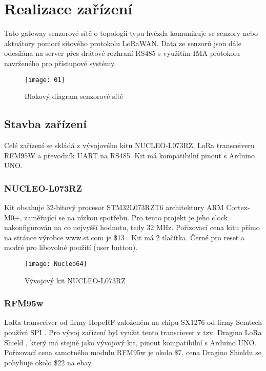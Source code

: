 \chapter{Realizace zařízení}

Tato gateway senzorové sítě o topologii typu hvězda komunikuje se senzory nebo aktuátory pomocí síťového protokolu LoRaWAN.
Data ze senzorů jsou dále odesílána na server přes drátové rozhraní RS485 s využitím IMA protokolu navrženého pro přístupové systémy.



\begin{figure}[!h]
    \centering
    \texttt{[image: 01]}
    \caption{Blokový diagram senzorové sítě}
    \label{fig:01}
\end{figure}

\newpage


\section{Stavba zařízení}
Celé zařízení se skládá z vývojového kitu NUCLEO-L073RZ, LoRa transceiveru RFM95W a převodník UART na RS485. Kit má kompatibilní pinout s Arduino UNO.


\subsection{NUCLEO-L073RZ}
Kit obsahuje 32-bitový procesor STM32L073RZT6 architektury ARM Cortex-M0+, zaměřující se na nízkou spotřebu. Pro tento projekt je jeho clock nakonfigurován na co nejvyšší hodnotu, tedy 32 MHz.
Pořizovací cena kitu přímo na stránce výrobce www.st.com je \$13 \cite{nucleoST} \cite{nucleoMbed}. Kit má 2 tlačítka. Černé pro reset a modré pro libovolné použití (user button).


\begin{figure}[!h]
    \centering
    \texttt{[image: Nucleo64]}
    \caption{Vývojový kit NUCLEO-L073RZ \cite{nucleoST}}
    \label{fig:02}
\end{figure}



\subsection{RFM95w}
LoRa transceiver od firmy HopeRF založeném na chipu SX1276 od firmy Semtech používá SPI \cite{RFM95w}.
Pro vývoj zařízení byl využit tento transciever v tzv. Dragino LoRa Shield \cite{draginoWiki}, který má stejně jako vývojový kit, pinout kompatibilní s Arduino UNO. Pořizovací cena samotného modulu RFM95w je okolo \$7, cena Dragino Shieldu se pohybuje okolo \$22 na ebay.

